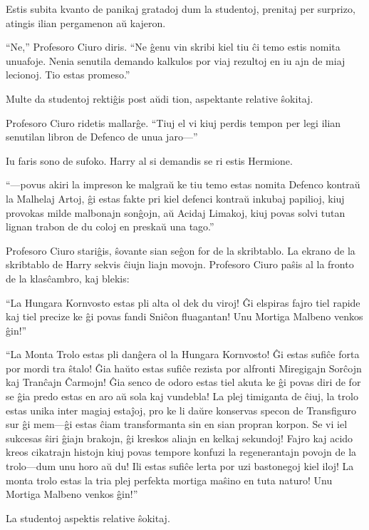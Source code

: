 Estis subita kvanto de panikaj gratadoj dum la studentoj, prenitaj per
surprizo, atingis ilian pergamenon aŭ kajeron.

``Ne,'' Profesoro Ciuro diris. ``Ne ĝenu vin skribi kiel tiu ĉi temo
estis nomita unuafoje. Nenia senutila demando kalkulos por viaj
rezultoj en iu ajn de miaj lecionoj. Tio estas promeso.''

Multe da studentoj rektiĝis post aŭdi tion, aspektante relative ŝokitaj.

Profesoro Ciuro ridetis mallarĝe. ``Tiuj el vi kiuj perdis tempon per
legi ilian senutilan libron de Defenco de unua jaro—''

Iu faris sono de sufoko. Harry al si demandis se ri estis Hermione.

``—povus akiri la impreson ke malgraŭ ke tiu temo estas nomita Defenco
kontraŭ la Malhelaj Artoj, ĝi estas fakte pri kiel defenci kontraŭ
inkubaj papilioj, kiuj provokas milde malbonajn sonĝojn, aŭ Acidaj
Limakoj, kiuj povas solvi tutan lignan trabon de du coloj en preskaŭ
una tago.''

Profesoro Ciuro stariĝis, ŝovante sian seĝon for de la skribtablo. La
ekrano de la skribtablo de Harry sekvis ĉiujn liajn movojn. Profesoro
Ciuro paŝis al la fronto de la klasĉambro, kaj blekis:

``La Hungara Kornvosto estas pli alta ol dek du viroj! Ĝi elspiras
fajro tiel rapide kaj tiel precize ke ĝi povas fandi Sniĉon
fluagantan! Unu Mortiga Malbeno venkos ĝin!''

``La Monta Trolo estas pli danĝera ol la Hungara Kornvosto! Ĝi estas
sufiĉe forta por mordi tra ŝtalo! Ĝia haŭto estas sufiĉe rezista por
alfronti Miregigajn Sorĉojn kaj Tranĉajn Ĉarmojn! Ĝia senco de odoro
estas tiel akuta ke ĝi povas diri de for se ĝia predo estas en aro aŭ
sola kaj vundebla! La plej timiganta de ĉiuj, la trolo estas unika
inter magiaj estaĵoj, pro ke li daŭre konservas specon de Transfiguro
sur ĝi mem—ĝi estas ĉiam transformanta sin en sian propran korpon. Se
vi iel sukcesas ŝiri ĝiajn brakojn, ĝi kreskos aliajn en kelkaj
sekundoj! Fajro kaj acido kreos cikatrajn histojn kiuj povas tempore
konfuzi la regenerantajn povojn de la trolo—dum unu horo aŭ du! Ili
estas sufiĉe lerta por uzi bastonegoj kiel iloj! La monta trolo estas
la tria plej perfekta mortiga maŝino en tuta naturo! Unu Mortiga
Malbeno venkos ĝin!''

La studentoj aspektis relative ŝokitaj.

